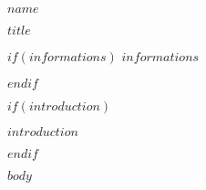 \documentclass[10pt, a4paper]{article}
\begin{document}
{\LARGE $name$\par}
{\large $title$\par}
\medskip

$if(informations)$
$informations$\par
\medskip
$endif$

$if(introduction)$
\begin{flushright}
{\em $introduction$}
\end{flushright}
$endif$

$body$
\end{document}
